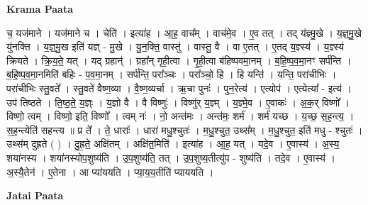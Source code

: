 \documentclass[17pt]{extarticle}
\begin{document}
\textbf{Krama Paata} \newline

च॒ यज॑माने । यज॑माने च । चेति॑ । इत्या॑ह । आ॒ह॒ वाच᳚म् । वाच॑मे॒व । ए॒व तत् । तद् य॑ज्ञ्मु॒खे । य॒ज्ञ्॒मु॒खे यु॑नक्ति । य॒ज्ञ्॒मु॒ख इति॑ यज्ञ् - मु॒खे । यु॒न॒क्ति॒ वास्तु॑ । वास्तु॒ वै । वा ए॒तत् । ए॒तद् य॒ज्ञ्स्य॑ । य॒ज्ञ्स्य॑ क्रियते । क्रि॒य॒ते॒ यत् । यद् ग्रहान्॑ । ग्रहा᳚न् गृही॒त्वा । गृ॒ही॒त्वा ब॑हिष्पवमा॒नम् । ब॒हि॒ष्प॒व॒मा॒नꣳ सर्प॑न्ति । ब॒हि॒ष्प॒व॒मा॒नमिति॑ बहिः - प॒व॒मा॒नम् । सर्प॑न्ति॒ परा᳚ञ्चः । परा᳚ञ्चो॒ हि । हि यन्ति॑ । यन्ति॒ परा॑चीभिः । परा॑चीभिः स्तु॒वते᳚ । स्तु॒वते॑ वैष्ण॒व्या । वै॒ष्ण॒व्यर्चा । ऋ॒चा पुनः॑ । पुन॒रेत्य॑ । एत्योप॑ । एत्येत्या᳚ - इत्य॑ । उप॑ तिष्ठते । ति॒ष्ठ॒ते॒ य॒ज्ञ्ः । य॒ज्ञो वै । वै विष्णुः॑ । विष्णु॑र् य॒ज्ञ्म् । य॒ज्ञ्मे॒व । ए॒वाकः॑ । अ॒क॒र् विष्णो᳚ । विष्णो॒ त्वम् । विष्णो॒ इति॒ विष्णो᳚ । त्वम् नः॑ । नो॒ अन्त॑मः । अन्त॑मः॒ शर्म॑ । शर्म॑ यच्छ । य॒च्छ॒ स॒ह॒न्त्य॒ । स॒ह॒न्त्येति॑ सहन्त्य ॥ प्र ते᳚ । ते॒ धाराः᳚ । धारा॑ मधु॒श्चुतः॑ । म॒धु॒श्चुत॒ उथ्स᳚म् । म॒धु॒श्चुत॒ इति॑ मधु - श्चुतः॑ । उथ्स॑म् दुह्रते ( ) । दु॒ह्र॒ते॒ अक्षि॑तम् । अक्षि॑त॒मिति॑ । इत्या॑ह । आ॒ह॒ यत् । यदे॒व । ए॒वास्य॑ । अ॒स्य॒ शया॑नस्य । शया॑नस्योप॒शुष्य॑ति । उ॒प॒शुष्य॑ति॒ तत् । उ॒प॒शुष्य॒तीत्यु॑प - शुष्य॑ति । तदे॒व । ए॒वास्य॑ । अ॒स्यै॒तेन॑ । ए॒तेना । आ प्या॑ययति । प्या॒य॒य॒तीति॑ प्याययति । \newline

\textbf{Jatai Paata} \newline
\end{document}
